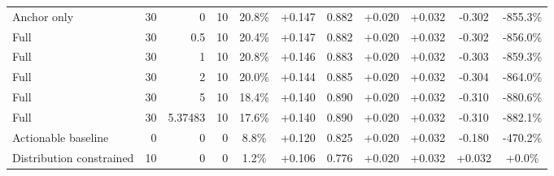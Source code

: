 \begin{table}[htbp]
\begin{tabular}{lrrrccccccc}
Anchor only & 30 & 0 & 10 & 20.8\% & +0.147 & 0.882 & +0.020 & +0.032 & -0.302 & -855.3\% \\
Full & 30 & 0.5 & 10 & 20.4\% & +0.147 & 0.882 & +0.020 & +0.032 & -0.302 & -856.0\% \\
Full & 30 & 1 & 10 & 20.8\% & +0.146 & 0.883 & +0.020 & +0.032 & -0.303 & -859.3\% \\
Full & 30 & 2 & 10 & 20.0\% & +0.144 & 0.885 & +0.020 & +0.032 & -0.304 & -864.0\% \\
Full & 30 & 5 & 10 & 18.4\% & +0.140 & 0.890 & +0.020 & +0.032 & -0.310 & -880.6\% \\
Full & 30 & 5.37483 & 10 & 17.6\% & +0.140 & 0.890 & +0.020 & +0.032 & -0.310 & -882.1\% \\
Actionable baseline & 0 & 0 & 0 & 8.8\% & +0.120 & 0.825 & +0.020 & +0.032 & -0.180 & -470.2\% \\
Distribution constrained & 10 & 0 & 0 & 1.2\% & +0.106 & 0.776 & +0.020 & +0.032 & +0.032 & +0.0\% \\
\bottomrule
\end{tabular}
\end{table}
